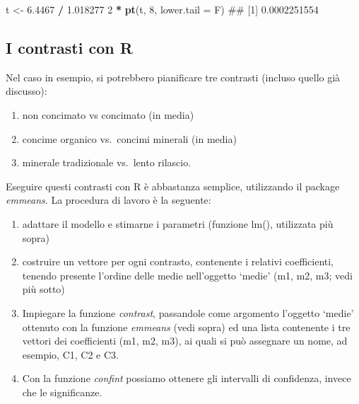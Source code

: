 \documentclass[a4paper,12pt,oneside]{book}
\providecommand{\tightlist}{%
  \setlength{\itemsep}{0pt}\setlength{\parskip}{0pt}}
\newenvironment{Shaded}{\begin{snugshade}}{\end{snugshade}}
\newcommand{\KeywordTok}[1]{\textcolor[rgb]{0.13,0.29,0.53}{\textbf{#1}}}
\newcommand{\DataTypeTok}[1]{\textcolor[rgb]{0.13,0.29,0.53}{#1}}
\newcommand{\DecValTok}[1]{\textcolor[rgb]{0.00,0.00,0.81}{#1}}
\newcommand{\FloatTok}[1]{\textcolor[rgb]{0.00,0.00,0.81}{#1}}
\newcommand{\StringTok}[1]{\textcolor[rgb]{0.31,0.60,0.02}{#1}}
\newcommand{\OperatorTok}[1]{\textcolor[rgb]{0.81,0.36,0.00}{\textbf{#1}}}
\newcommand{\NormalTok}[1]{#1}
\theoremstyle{definition}
\theoremstyle{definition}
\theoremstyle{definition}
\theoremstyle{remark}
\begin{document}
\begin{Shaded}
\begin{Highlighting}[]
\NormalTok{t <-}\StringTok{ }\FloatTok{6.4467} \OperatorTok{/}\StringTok{ }\FloatTok{1.018277}
\DecValTok{2} \OperatorTok{*}\StringTok{ }\KeywordTok{pt}\NormalTok{(t, }\DecValTok{8}\NormalTok{, }\DataTypeTok{lower.tail =}\NormalTok{ F)}
\NormalTok{## [1] 0.0002251554}
\end{Highlighting}
\end{Shaded}

\subsection{I contrasti con R}\label{i-contrasti-con-r}

Nel caso in esempio, si potrebbero pianificare tre contrasti (incluso
quello già discusso):

\begin{enumerate}
\def\labelenumi{\arabic{enumi}.}
\tightlist
\item
  non concimato vs concimato (in media)
\item
  concime organico vs.~concimi minerali (in media)
\item
  minerale tradizionale vs.~lento rilascio.
\end{enumerate}

Eseguire questi contrasti con R è abbastanza semplice, utilizzando il
package \emph{emmeans}. La procedura di lavoro è la seguente:

\begin{enumerate}
\def\labelenumi{\arabic{enumi}.}
\tightlist
\item
  adattare il modello e stimarne i parametri (funzione lm(), utilizzata
  più sopra)
\item
  costruire un vettore per ogni contrasto, contenente i relativi
  coefficienti, tenendo presente l'ordine delle medie nell'oggetto
  `medie' (m1, m2, m3; vedi più sotto)
\item
  Impiegare la funzione \emph{contrast}, passandole come argomento
  l'oggetto `medie' ottenuto con la funzione \emph{emmeans} (vedi sopra)
  ed una lista contenente i tre vettori dei coefficienti (m1, m2, m3),
  ai quali si può assegnare un nome, ad esempio, C1, C2 e C3.
\item
  Con la funzione \emph{confint} possiamo ottenere gli intervalli di
  confidenza, invece che le significanze.
\end{enumerate}

\small
\end{document}
